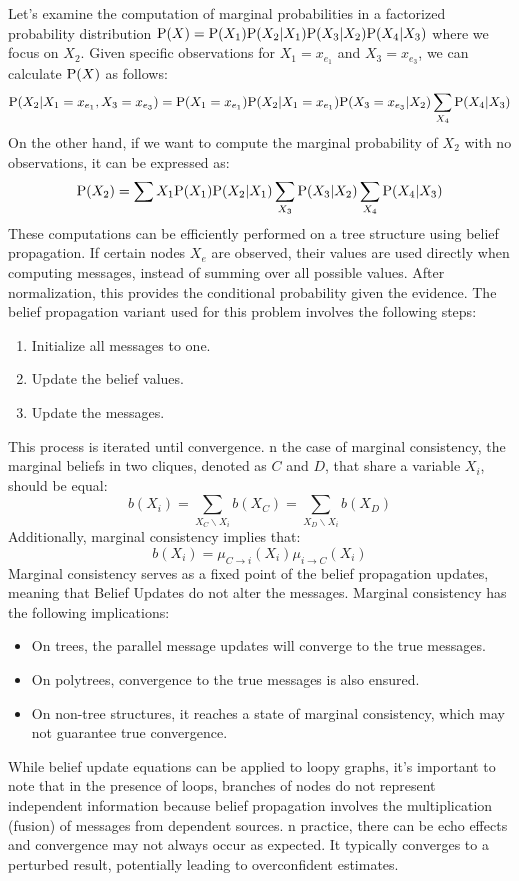 Let's examine the computation of marginal probabilities in a factorized probability distribution $\textnormal{P}(X)=\textnormal{P}( X_1) \textnormal{P} (X_2|X_1) \textnormal{P} (X_3|X_2) \textnormal{P} (X_4|X_3)$ where we focus on $X_2$. 
Given specific observations for $X_1=x_{e_1}$ and $X_3=x_{e_3}$, we can calculate $\textnormal{P}(X)$ as follows:
\[\textnormal{P} (X_2|X_1 = x_{e_1}, X_3 = x_{e_3})= \textnormal{P} (X_1 = x_{e_1})\textnormal{P} (X_2|X_1 = x_{e_1})\textnormal{P} (X_3 = x_{e_3}|X_2) \sum_{X_4}\textnormal{P} (X_4|X_3)\]
On the other hand, if we want to compute the marginal probability of $X_2$ with no observations, it can be expressed as:
\[\textnormal{P}(X_2)=\sum{X_1}\textnormal{P}(X_1)\textnormal{P}(X_2|X_1)\sum_{X_3}\textnormal{P}(X_3|X_2)\sum_{X_4}\textnormal{P}(X_4|X_3)\]
These computations can be efficiently performed on a tree structure using belief propagation. 
If certain nodes $X_e$ are observed, their values are used directly when computing messages, instead of summing over all possible values.
After normalization, this provides the conditional probability given the evidence.
The belief propagation variant used for this problem involves the following steps:
\begin{enumerate}
    \item Initialize all messages to one.
    \item Update the belief values.
    \item Update the messages.
\end{enumerate}
This process is iterated until convergence.
n the case of marginal consistency, the marginal beliefs in two cliques, denoted as $C$ and $D$, that share a variable $X_i$, should be equal:
\[b(X_i)=\sum_{X_C \backslash X_i}b(X_C)=\sum_{X_D \backslash X_i}b(X_D)\]
Additionally, marginal consistency implies that:
\[b(X_i)=\mu_{C \rightarrow i}(X_i)\mu_{i \rightarrow C}(X_i)\]
Marginal consistency serves as a fixed point of the belief propagation updates, meaning that Belief Updates do not alter the messages.
Marginal consistency has the following implications:
\begin{itemize}
    \item On trees, the parallel message updates will converge to the true messages.
    \item On polytrees, convergence to the true messages is also ensured.
    \item On non-tree structures, it reaches a state of marginal consistency, which may not guarantee true convergence.
\end{itemize}
While belief update equations can be applied to loopy graphs, it's important to note that in the presence of loops, branches of nodes do not represent independent information because belief propagation involves the multiplication (fusion) of messages from dependent sources.
n practice, there can be echo effects and convergence may not always occur as expected. 
It typically converges to a perturbed result, potentially leading to overconfident estimates.